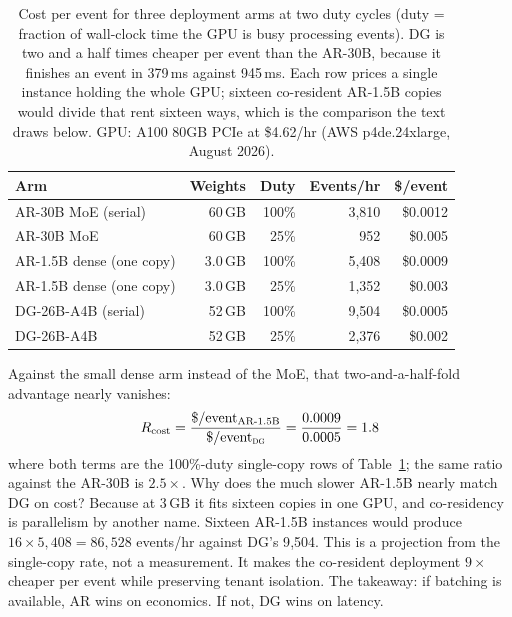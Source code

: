 \begin{table}[h]
\centering
\caption{Cost per event for three deployment arms at two duty cycles
(duty = fraction of wall-clock time the GPU is busy processing events).
DG is two and a half times cheaper per event than the AR-30B, because it
finishes an event in 379\,ms against 945\,ms. Each row prices a
single instance holding the whole GPU; sixteen co-resident AR-1.5B
copies would divide that rent sixteen ways, which is the comparison
the text draws below. GPU: A100 80GB PCIe at \$4.62/hr (AWS
p4de.24xlarge, August 2026).}
\label{tab:cost}
\begin{tabular}{@{}lrrrr@{}}
\toprule
Arm & Weights & Duty & Events/hr & \$/event \\
\midrule
AR-30B MoE (serial) & 60\,GB & 100\% & 3{,}810 & \$0.0012 \\
AR-30B MoE           & 60\,GB & 25\%  & 952 & \$0.005 \\
\midrule
AR-1.5B dense (one copy)    & 3.0\,GB & 100\% & 5{,}408 & \$0.0009 \\
AR-1.5B dense (one copy)     & 3.0\,GB & 25\%  & 1{,}352 & \$0.003 \\
\midrule
DG-26B-A4B (serial)  & 52\,GB & 100\% & 9{,}504 & \$0.0005 \\
DG-26B-A4B            & 52\,GB & 25\%  & 2{,}376 & \$0.002 \\
\bottomrule
\end{tabular}
\end{table}

Against the small dense arm instead of the MoE, that two-and-a-half-fold
advantage nearly vanishes:
\begin{equation}
R_{\mathrm{cost}} = \frac{\$ / \mathrm{event}_{\text{AR-1.5B}}}
{\$ / \mathrm{event}_{\textsc{dg}}}
= \frac{0.0009}{0.0005} = 1.8
\end{equation}
where both terms are the 100\%-duty single-copy rows of
Table~\ref{tab:cost}; the same ratio against the AR-30B is
$2.5\times$. Why does the much slower AR-1.5B nearly match DG on
cost? Because at 3\,GB it fits sixteen copies in one GPU, and
co-residency is parallelism by another name. Sixteen AR-1.5B instances
would produce $16 \times 5{,}408 = 86{,}528$ events/hr against DG's
9{,}504. This is a projection from the single-copy rate, not a
measurement. It makes the co-resident deployment $9\times$ cheaper per
event while preserving tenant isolation. The takeaway: if batching is
available, AR wins on economics. If not, DG wins on latency.

